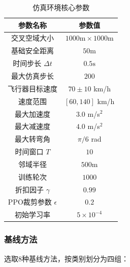 \documentclass[12pt,a4paper,UTF8]{ctexart}
\begin{document}
\begin{table}[H]
    \centering
    \caption{仿真环境核心参数}
    \label{tab:env_params}
    \begin{tabular}{|c|c|}
        \hline
        \textbf{参数名称} & \textbf{参数值} \\
        \hline
        交叉空域大小 & $1000\text{m} \times 1000\text{m}$ \\
        基础安全距离 & $50\text{m}$ \\
        时间步长 $\Delta t$ & $0.5\text{s}$ \\
        最大仿真步长 & $200$ \\
        飞行器目标速度 & $70 \pm 10$ km/h \\
        速度范围 & $[60, 140]$ km/h \\
        最大加速度 & $3.0$ m/s$^2$ \\
        最大减速度 & $4.0$ m/s$^2$ \\
        最大转弯角 & $\pi/6$ rad \\
        时间窗口 $T$ & $10$ \\
        邻域半径 & $500\text{m}$ \\
        训练轮次 & $1000$ \\
        折扣因子 $\gamma$ & $0.99$ \\
        PPO裁剪参数 $\epsilon$ & $0.2$ \\
        初始学习率 & $5 \times 10^{-4}$ \\
        \hline
    \end{tabular}
\end{table}

\subsubsection{基线方法}

选取8种基线方法，按类别划分为四组：
\end{document}
